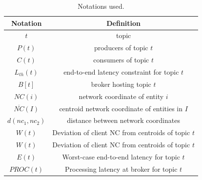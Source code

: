 \begin{table}[t]
	\center
		\begin{tabular}{ |c|c| } 
			\hline
			\textbf{Notation} & \textbf{Definition}\\ 
			\hline
			$t$ & topic\\
			$P\left( t \right)$ & producers of topic $t$\\
			$C\left( t \right)$ & consumers of topic $t$\\
			$L_{th}\left( t \right)$ & end-to-end latency constraint for topic $t$\\
			$B\left[ t \right]$ & broker hosting topic $t$\\
			$NC\left( i \right)$ & network coordinate of entity $i$\\
			$\overline{NC}\left( I \right)$ & centroid network coordinate of entities in $I$\\
			$d\left( nc_1, nc_2 \right)$ & distance between network coordinates\\
			$W\left( t \right)$ & Deviation of client NC from centroids of topic $t$\\
			$W\left( t \right)$ & Deviation of client NC from centroids of topic $t$\\
			$E\left( t \right)$ & Worst-case end-to-end latency for topic $t$\\
			$PROC \left( t \right)$ & Processing latency at broker for topic $t$\\
			\hline
		\end{tabular}
	\caption{Notations used.}\label{table:notations}
\end{table}

